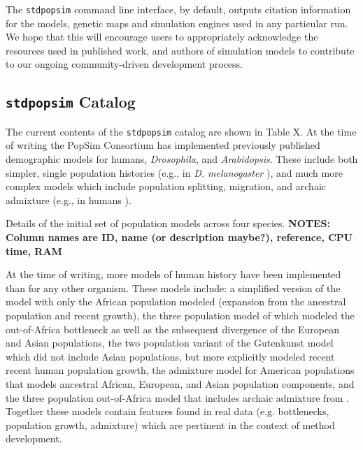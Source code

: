 \documentclass[12pt,halfline,a4paper]{ouparticle}
\newcommand{\stdpopsim}{\texttt{stdpopsim} }
\begin{document}
The \stdpopsim command line interface, by default, outputs citation information
for the models, genetic maps and simulation engines used in any particular run.
We hope that this will encourage users to appropriately acknowledge the
resources used in published work, and authors
of simulation models to contribute to our ongoing community-driven development process.

\subsection*{\texttt{stdpopsim} Catalog}
The current contents of the \texttt{stdpopsim} catalog are shown in Table X. At the time of
writing the PopSim Consortium has implemented previously published demographic models for
humans, \emph{Drosophila}, and \emph{Arabidopsis}. These include both
simpler, single population histories (e.g., in \emph{D. melanogaster} \cite{sheehan2016deep}),
and much more complex models which include population splitting, migration, and archaic
admixture (e.g., in humans \cite{ragsdale2019models}).

\begin{table}
\begin{footnotesize}

\end{footnotesize}
\caption{\label{tab:catalog}
Details of the initial set of population models across four species.
\textbf{NOTES: Column names are ID, name (or description maybe?),
reference, CPU time, RAM}
}
\end{table}

At the time of writing, more models of human history have been implemented than for
any other organism. These models include: a simplified version of the \cite{tennessen2012evolution}
model with only the African population modeled (expansion from the ancestral
population and recent growth), the three population model of \cite{gutenkunst2009inferring}
which modeled the out-of-Africa bottleneck as well as the subsequent divergence of
the European and Asian populations, the \cite{tennessen2012evolution} two population variant of the
Gutenkunst model which did not include Asian populations, but more explicitly modeled
recent recent human population growth, the \cite{browning2018ancestry} admixture model
for American populations that models ancestral African, European, and Asian population
components, and the three population out-of-Africa model that includes archaic admixture
from \cite{ragsdale2019models}. Together these models
contain features found in real data (e.g. bottlenecks, population growth,
admixture) which are pertinent in the context of method development.
\end{document}
